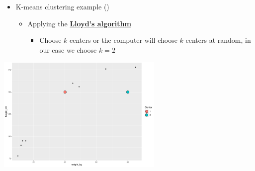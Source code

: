 \documentclass[
  ignorenonframetext,
]{beamer}
\providecommand{\tightlist}{%
  \setlength{\itemsep}{0pt}\setlength{\parskip}{0pt}}\usepackage{longtable,booktabs,array}
\begin{document}
\begin{frame}{}
\label{section-36}
\begin{itemize}
\item
  K-means clustering example
  ()

  \begin{itemize}
  \item
    Applying the
    \href{https://en.wikipedia.org/wiki/K-means_clustering}{\textbf{Lloyd's
    algorithm}}

    \begin{itemize}
    \tightlist
    \item
      Choose \(k\) centers or the computer will choose \(k\) centers at
      random, in our case we choose \(k = 2\)
    \end{itemize}
  \end{itemize}
\end{itemize}

\begin{center}
\includegraphics[width=0.6\textwidth,height=\textheight]{011_segmentation_clustering_files/figure-beamer/unnamed-chunk-26-1.pdf}
\end{center}
\end{frame}
\end{document}
